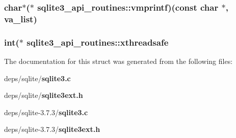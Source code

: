 \subsubsection{\setlength{\rightskip}{0pt plus 5cm}char$\ast$($\ast$ \bf{sqlite3\_\-api\_\-routines::vmprintf})(const char $\ast$, va\_\-list)}\label{structsqlite3__api__routines_1eb2c383fbe6be4da3862cc9e2d4c737}


\subsubsection{\setlength{\rightskip}{0pt plus 5cm}int($\ast$ \bf{sqlite3\_\-api\_\-routines::xthreadsafe}}\label{structsqlite3__api__routines_90c68e759a98b661f4a9f20a42c16e70}




The documentation for this struct was generated from the following files:\begin{CompactItemize}
\item 
deps/sqlite/\bf{sqlite3.c}\item 
deps/sqlite/\bf{sqlite3ext.h}\item 
deps/sqlite-3.7.3/\bf{sqlite3.c}\item 
deps/sqlite-3.7.3/\bf{sqlite3ext.h}\end{CompactItemize}
